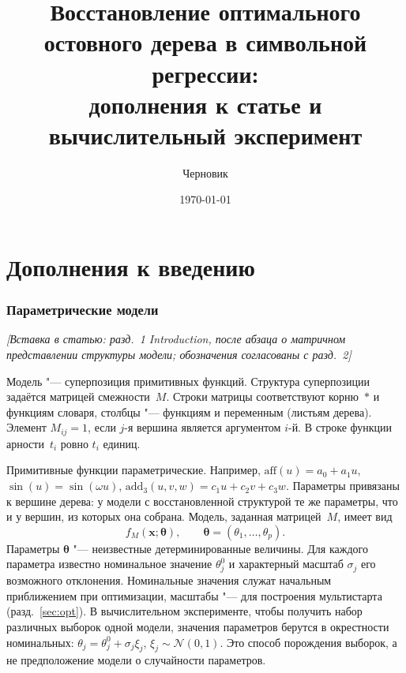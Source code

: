 \documentclass[12pt]{article}
\newcommand{\where}[1]{\par\noindent\textit{[Вставка в статью: #1]}\par\smallskip}
\newcommand{\vx}{\mathbf{x}}
\newcommand{\tht}{\bm{\theta}}
\begin{document}
\title{Восстановление оптимального остовного дерева в символьной регрессии:\\
дополнения к статье и вычислительный эксперимент}
\author{Черновик}
\date{\today}
\maketitle

\tableofcontents

\part{Дополнения к введению}

\section{Параметрические модели}
\where{разд.~1 Introduction, после абзаца о матричном представлении структуры модели; обозначения согласованы с разд.~2}

Модель "--- суперпозиция примитивных функций. Структура суперпозиции задаётся матрицей смежности~$M$. Строки матрицы соответствуют корню~$\ast$ и функциям словаря, столбцы "--- функциям и переменным (листьям дерева). Элемент $M_{ij}=1$, если $j$-я вершина является аргументом $i$-й. В строке функции арности~$t_i$ ровно $t_i$ единиц.

Примитивные функции параметрические. Например, $\mathrm{aff}(u)=a_0+a_1u$, $\sin(u)=\sin(\omega u)$, $\mathrm{add}_3(u,v,w)=c_1u+c_2v+c_3w$. Параметры привязаны к вершине дерева: у модели с восстановленной структурой те же параметры, что и у вершин, из которых она собрана. Модель, заданная матрицей~$M$, имеет вид
\[
f_M(\vx;\tht),\qquad \tht=(\theta_1,\dots,\theta_p).
\]
Параметры $\tht$ "--- неизвестные детерминированные величины. Для каждого параметра известно номинальное значение $\theta_j^0$ и характерный масштаб $\sigma_j$ его возможного отклонения. Номинальные значения служат начальным приближением при оптимизации, масштабы "--- для построения мультистарта (разд.~\ref{sec:opt}). В вычислительном эксперименте, чтобы получить набор различных выборок одной модели, значения параметров берутся в окрестности номинальных: $\theta_j=\theta_j^0+\sigma_j\xi_j$, $\xi_j\sim\mathcal N(0,1)$. Это способ порождения выборок, а не предположение модели о случайности параметров.
\end{document}
